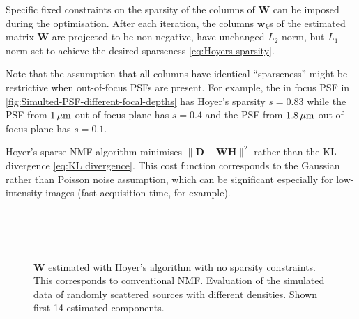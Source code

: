 Specific fixed constraints on the sparsity of the columns of $\bm{W}$ can be imposed during the optimisation. After each iteration, the columns $\bm{w}_k$s of the estimated matrix $\bm{W}$ are projected to be non-negative, have unchanged $L_{2}$ norm, but $L_{1}$ norm set to achieve the desired sparseness \autoref{eq:Hoyers sparsity}.

Note that the assumption that all columns have identical ``sparseness'' might be restrictive when out-of-focus PSFs are present. For example, the in focus PSF in \autoref{fig:Simulted-PSF-different-focal-depths} has Hoyer's sparsity $s=0.83$ while the PSF from $1 \, \mathrm{\mu m}$ out-of-focus plane has $s=0.4$ and the PSF from $1.8 \, \mathrm{\mu m}$ out-of-focus plane  has $s=0.1$.

Hoyer's sparse NMF algorithm minimises $\|\bm{D} - \bm{WH}\|^{2}$ rather than the KL-divergence \autoref{eq:KL divergence}. This cost function corresponds to the Gaussian rather than Poisson noise assumption, which can be significant especially for low-intensity images (fast acquisition time, for example). 

\begin{figure}[!htb] %
	\newcommand{\sizefig}{.9}
	\centering
	\\
	\\
	\\	
	\caption{$\bm{W}$ estimated with Hoyer's algorithm with no sparsity constraints. This corresponds to conventional NMF. Evaluation of the simulated data of randomly scattered sources with different densities. Shown first 14 estimated components.}
	\label{fig: Hoyer no sparsity constraint}
\end{figure}

